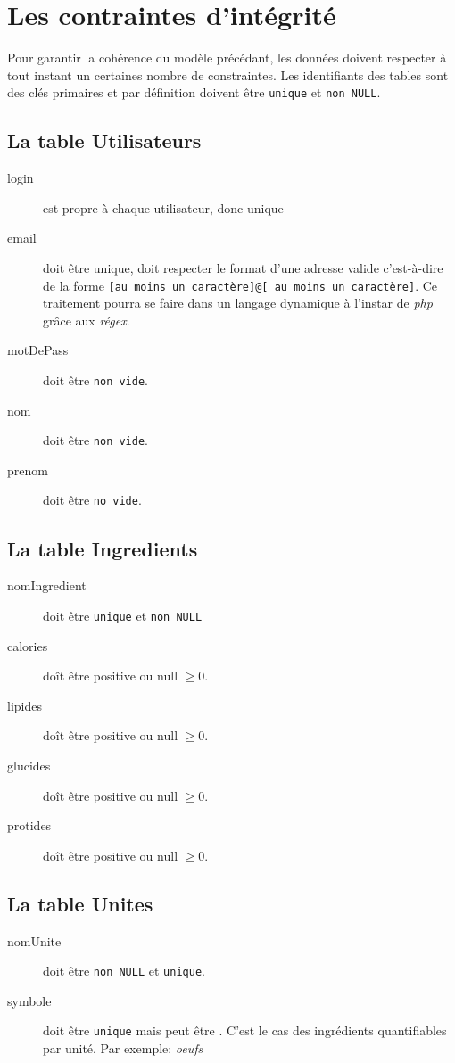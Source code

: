 \section{Les contraintes d'intégrité}
Pour garantir la cohérence du modèle précédant, les données doivent respecter à tout instant un certaines nombre de constraintes.
\newline
Les identifiants des tables sont des clés primaires et par définition doivent être \texttt{unique} et \texttt{non NULL}.

\subsection{La table Utilisateurs}
\begin{description}
    \item[login] est propre à chaque utilisateur, donc unique
    \item[email] doit être unique, doit respecter le format d'une adresse valide c'est-à-dire de la forme \texttt{[au\_moins\_un\_caractère]@[ au\_moins\_un\_caractère]}. Ce traitement pourra se faire dans un langage dynamique à l'instar de \textit{php} grâce aux \textit{régex}.
    \item[motDePass] doit être \texttt{non vide}.
    \item[nom] doit être \texttt{non vide}.
    \item[prenom] doit être \texttt{no vide}.
\end{description}

\subsection{La table Ingredients}
\begin{description}
    \item[nomIngredient] doit être \texttt{unique} et \texttt{non NULL}
    \item[calories] doît être positive ou null \(\geqslant 0\).
    \item[lipides] doît être positive ou null \(\geqslant 0\).
    \item[glucides] doît être positive ou null \(\geqslant 0\).
    \item[protides] doît être positive ou null \(\geqslant 0\).
\end{description}

\subsection{La table Unites}
\begin{description}
    \item[nomUnite] doit être \texttt{non NULL} et \texttt{unique}.
    \item[symbole] doit être \texttt{unique} mais peut être . C'est le cas des ingrédients quantifiables par unité. Par exemple: \textit{oeufs}
\end{description}

